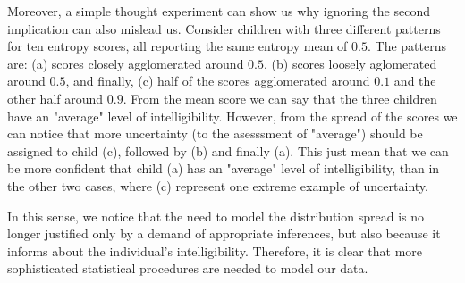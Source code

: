 Moreover, a simple thought experiment can show us why ignoring the second implication can also mislead us. Consider children with three different patterns for ten entropy scores, all reporting the same entropy mean of $0.5$. The patterns are: (a) scores closely agglomerated around $0.5$, (b) scores loosely aglomerated around $0.5$, and finally, (c) half of the scores agglomerated around $0.1$ and the other half around $0.9$. From the mean score we can say that the three children have an "average" level of intelligibility. However, from the spread of the scores we can notice that more uncertainty (to the asesssment of "average") should be assigned to child (c), followed by (b) and finally (a). This just mean that we can be more confident that child (a) has an "average" level of intelligibility, than in the other two cases, where (c) represent one extreme example of uncertainty. 

In this sense, we notice that the need to model the distribution spread is no longer justified only by a demand of appropriate inferences, but also because it informs about the individual's intelligibility. Therefore, it is clear that more sophisticated statistical procedures are needed to model our data.

\begin{comment}
	
	First, as previous paragraphs reveal, the intelligibility scores are `complex' in nature, however, such `complexity' is rarely fully considered in the statistical modeling procedure. The problem with the later is that, because the data does not fulfill the typical assumptions, e.g. normality, its analysis under such models might lead us to erroneous conclusions \textcolor{red}{[citation]}. On the one hand, outcomes such as the number of (un)intelligible words are discrete, while the entropy scores are continuous in nature. In addition, there is the consideration that both scores are constraint in specific bounds, i.e. the number of (un)intelligible words cannot be negative, while the entropy scores are in the bounds between zero and one. Finally, given the rating procedure's nature, the scores are produced in a clustered manner, i.e. we observe several score measurements per child. 
	
	So far the literature shows that, even when the data does not conform to the `normality' assumption, the applied statistical procedures are still supported on it, examples of this can be seen in \citep{Boonen_et_al_2021, Flipsen_et_al_2006} and \citep{Hustad_et_al_2020}. In addition, some papers in the literature have even used (hierarchical) multilevel modeling to deal with the clustered nature of the data, e.g. \citep{Boonen_et_al_2021}. However, to the authors knowledge, no paper have dealt with all of the data nuances at once, which leads us to believe that, by using more sophisticated statistical models we could improve our statistical inferences. 

\end{comment}

